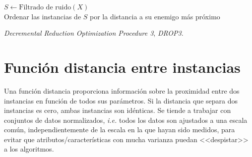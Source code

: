 \begin{algorithm}[H]
  	\BlankLine
  $S \leftarrow \text{Filtrado de ruido}(X)$ \\
	Ordenar las instancias de $S$ por la distancia a su enemigo más próximo \\
	\caption{\textit{Decremental Reduction Optimization Procedure 3}, \textit{DROP3}.}\label{alg:DROP3}
\end{algorithm}

\section{Función distancia entre instancias}
Una función distancia proporciona información sobre la proximidad entre dos instancias en función de todos sus parámetros. Si la distancia que separa dos instancias es cero, ambas instancias son idénticas. Se tiende a trabajar con conjuntos de datos normalizados, \textit{i.e.} todos los datos son ajustados a una escala común, independientemente de la escala en la que hayan sido medidos, para evitar que atributos/características con mucha varianza puedan <<despistar>> a los algoritmos.

